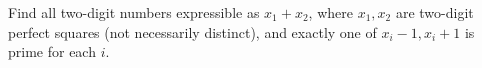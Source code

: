 Find all two-digit numbers expressible as $x_1+x_2$, where $x_1,x_2$ are two-digit perfect squares (not necessarily distinct), and exactly one of $x_i-1,x_i+1$ is prime for each $i$.
